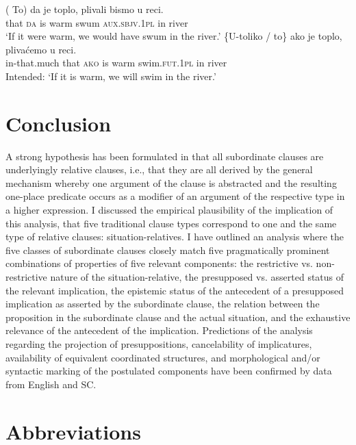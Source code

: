 \documentclass[output=paper]{langscibook}
\begin{document}
\ea\label{ex:Correl2}
		\ea \gll (\minsp{*} To) da je toplo, plivali bismo u reci.\\
{}{} that  \textsc{da}  is  warm  swum  \textsc{aux.sbjv.1pl}  in  river\\
\glt `If it were warm, we would have swum in the river.'\label{ex:Correl2-a}
	\ex \gll \minsp{*} \{U-toliko / to\} ako je toplo, plivaćemo u reci.\\
    {} in-that.much {} that  \textsc{ako} is warm swim.\textsc{fut.1pl} in river\\
\glt Intended: `If it is warm, we will swim in the river.'\label{ex:Correl2-b}
\z\z


\section{Conclusion}\label{sec:Conclusion}
A strong hypothesis has been formulated in \citet{Arsenijevic2006} that all subordinate clauses are underlyingly relative clauses, i.e., that they are all derived by the general mechanism whereby one argument of the clause is abstracted and the resulting one-place predicate occurs as a modifier of an argument of the respective type in a higher expression. I discussed the empirical plausibility of the implication of this analysis, that five traditional clause types correspond to one and the same type of relative clauses: situation-relatives. I have outlined an analysis where the five classes of subordinate clauses closely match five pragmatically prominent combinations of properties of five relevant components: the restrictive vs. non-restrictive nature of the situation-relative, the presupposed vs. asserted status of the relevant implication, the epistemic status of the antecedent of a presupposed implication as asserted by the subordinate clause, the relation between the proposition in the subordinate clause and the actual situation, and the exhaustive relevance of the antecedent of the implication. Predictions of the analysis regarding the projection of presuppositions, cancelability of implicatures, availability of equivalent coordinated structures, and morphological and/or syntactic marking of the postulated components have been confirmed by data from English and SC.


\section*{Abbreviations}
\end{document}
